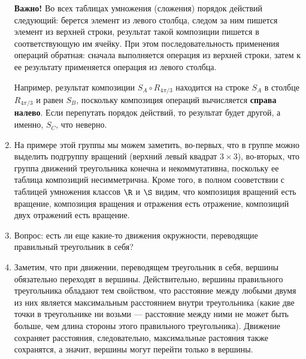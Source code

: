 \begin{enumerate}
\textbf{Важно!} Во всех таблицах умножения (сложения) порядок действий следующий: берется элемент из левого столбца, следом за ним пишется элемент из верхней строки, результат такой композиции пишется в соответствующую им ячейку. При этом последовательность применения операций обратная: сначала выполняется операция из верхней строки, затем к ее результату применяется операция из левого столбца.

Например, результат композиции $S_A\circ R_{4\pi/3}$ находится на строке $S_A$ в столбце $R_{4\pi/3}$ и равен $S_B$, поскольку композиция операций вычисляется \textbf{справа налево}. Если перепутать порядок действий, то результат будет другой, а именно, $S_C$, что неверно.

\item На примере этой группы мы можем заметить, во-первых, что в группе можно выделить подгруппу вращений (верхний левый квадрат $3\times 3$), во-вторых, что группа движений треугольника конечна и некоммутативна, поскольку ее таблица композиций несимметрична. Кроме того, в полном сооветствии с таблицей умножения классов $\R$ и $\S$ видим, что композиция вращений есть вращение, композиция вращения и отражения есть отражение, композиций двух отражений есть вращение.
\item Вопрос: есть ли еще какие-то движения окружности, переводящие правильный треугольник в себя?
\item Заметим, что при движении, переводящем треугольник в себя, вершины обязательно переходят в вершины.
Действительно, вершины правильного треугольника обладают тем свойством, что расстояние между любыми двумя из них является максимальным расстоянием внутри треугольника (какие две точки в треугольнике ни возьми --- расстояние между ними не может быть больше, чем длина стороны этого правильного треугольника). Движение сохраняет расстояния, следовательно, максимальные растояния также сохранятся, а значит, вершины могут перейти только в вершины.


\end{enumerate}
